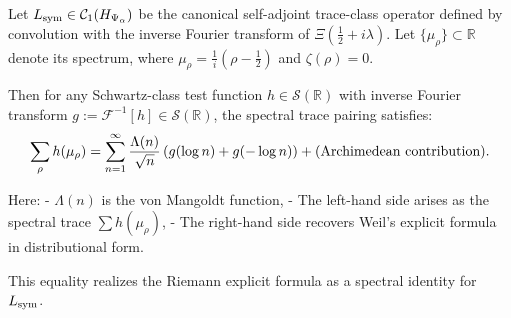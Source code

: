 \begin{proposition}
\label{prop:explicit_formula_operator}

Let \( L_{\mathrm{sym}} \in \mathcal{C}_1(H_{\Psi_\alpha}) \) be the canonical self-adjoint trace-class operator defined by convolution with the inverse Fourier transform of \( \Xi\left(\tfrac{1}{2} + i\lambda\right) \). Let \( \{ \mu_\rho \} \subset \mathbb{R} \) denote its spectrum, where \( \mu_\rho = \tfrac{1}{i}(\rho - \tfrac{1}{2}) \) and \( \zeta(\rho) = 0 \).

Then for any Schwartz-class test function \( h \in \mathcal{S}(\mathbb{R}) \) with inverse Fourier transform \( g := \mathcal{F}^{-1}[h] \in \mathcal{S}(\mathbb{R}) \), the spectral trace pairing satisfies:
\[
\sum_{\rho} h(\mu_\rho) = \sum_{n=1}^{\infty} \frac{\Lambda(n)}{\sqrt{n}} \left( g(\log n) + g(-\log n) \right)
+ \textnormal{(Archimedean contribution)}.
\]

Here:
- \( \Lambda(n) \) is the von Mangoldt function,
- The left-hand side arises as the spectral trace \( \sum h(\mu_\rho) \),
- The right-hand side recovers Weil’s explicit formula in distributional form.

This equality realizes the Riemann explicit formula as a spectral identity for \( L_{\mathrm{sym}} \).
\end{proposition}
